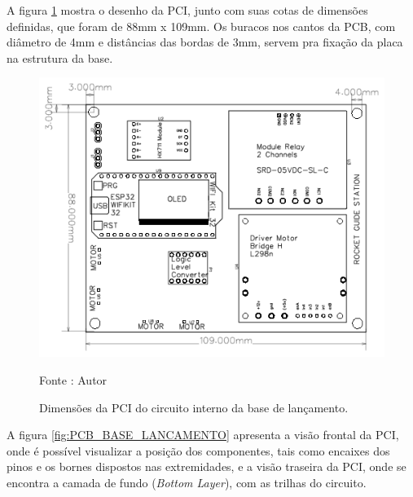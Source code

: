 A figura \ref{fig:PCB_BASE_LANCAMENTO_DES} mostra o desenho da PCI, junto com suas cotas de dimensões definidas, que foram de 88mm x 109mm. Os buracos nos cantos da PCB, com diâmetro de 4mm e distâncias das bordas de 3mm, servem pra fixação da placa na estrutura da base.

\begin{figure}[H]
  \centering
  \includegraphics[scale=0.5]{figuras/PCB_Base_Lancamento_Desenho.png}
  \caption{ Dimensões da PCI do circuito interno da base de lançamento. } 
  {\footnotesize Fonte : Autor } 
  \label{fig:PCB_BASE_LANCAMENTO_DES}
\end{figure}

A figura \ref{fig:PCB_BASE_LANCAMENTO} apresenta a visão frontal da PCI, onde é possível visualizar a posição dos componentes, tais como encaixes dos pinos e os bornes dispostos nas extremidades, e a visão traseira da PCI, onde se encontra a camada de fundo (\textit{Bottom Layer}), com as trilhas do circuito.

